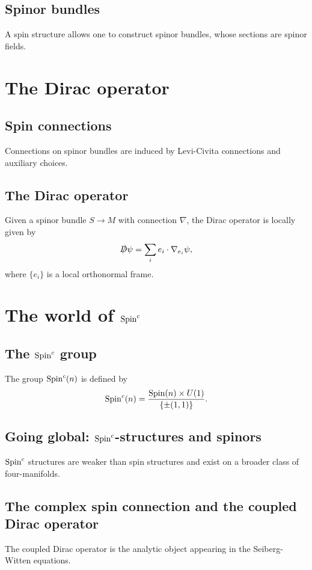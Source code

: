 \subsection{Spinor bundles}
A spin structure allows one to construct spinor bundles, whose sections are spinor fields.

\section{The Dirac operator}
\subsection{Spin connections}
Connections on spinor bundles are induced by Levi-Civita connections and auxiliary choices.

\subsection{The Dirac operator}
\begin{definition}
Given a spinor bundle $S\to M$ with connection $\nabla$, the Dirac operator is locally given by
\[
  \slashed{D}\psi = \sum_i e_i\cdot \nabla_{e_i}\psi,
\]
where $\{e_i\}$ is a local orthonormal frame.
\end{definition}

\section{The world of $\operatorname{Spin}^{c}$}
\subsection{The $\operatorname{Spin}^{c}$ group}
\begin{definition}
The group $\operatorname{Spin}^{c}(n)$ is defined by
\[
  \operatorname{Spin}^{c}(n)=\frac{\operatorname{Spin}(n)\times U(1)}{\{\pm(1,1)\}}.
\]
\end{definition}

\subsection{Going global: $\operatorname{Spin}^{c}$-structures and spinors}
$\operatorname{Spin}^{c}$ structures are weaker than spin structures and exist on a broader class of four-manifolds.

\subsection{The complex spin connection and the coupled Dirac operator}
The coupled Dirac operator is the analytic object appearing in the Seiberg-Witten equations.

